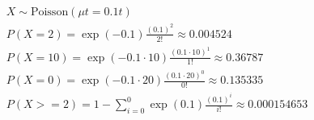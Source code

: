 \documentclass{article}
\begin{document}
            \begin{gather*}
                X \sim \text{Poisson}(\mu t = 0.1 t) \\
                P(X = 2) = \exp(-0.1) \frac{(0.1)^{2}}{2!} \approx 0.004524 \\
                P(X = 10) = \exp(-0.1 \cdot 10) \frac{(0.1 \cdot 10)^{1}}{1!} \approx 0.36787 \\
                P(X = 0) = \exp(-0.1 \cdot 20) \frac{(0.1 \cdot 20)^{0}}{0!} \approx 0.135335 \\
                P(X >= 2) = 1 - \sum_{i=0}^{0} \exp(0.1) \frac{(0.1)^{i}}{i!} \approx 0.000154653
            \end{gather*}
\end{document}
